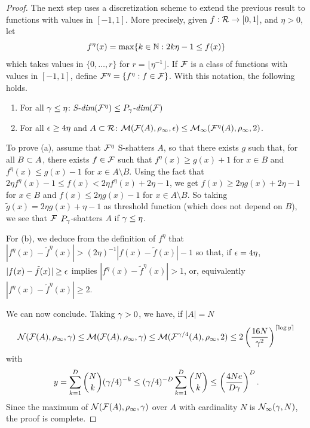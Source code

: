 \begin{proof}
 The next step uses a discretization scheme to extend the previous result to functions with values in $[-1,1]$. More precisely, given $f: \CR\to [0,1]$, and $\eta>0$, let
\[
f^\eta(x) = \max\{k\in\mN: 2k\eta -1 \leq f(x)\}
\]
which takes values in $\{0, \ldots, r\}$ for $r = \lfloor \eta^{-1}\rfloor$. If $\CF$ is a class of functions with values in $[-1,1]$, define $\CF^\eta = \{f^\eta: f\in\CF\}$. With this notation, the following holds.
\begin{enumerate}[label= (\alph*)]
\item For all $\ga \leq \eta$: $\Sdim(\CF^\eta) \leq \Pdim[\ga](\CF)$
\item For all $\ep\geq 4\eta$ and $A\sub \CR$: $\CM(\CF(A), \rho_\infty, \ep) \leq \CM_\infty(\CF^\eta(A), \rho_\infty, 2)$.
\end{enumerate}

To prove (a), assume that $\CF^\eta$ S-shatters $A$, so that there exists $g$ such that, for all $B\sub A$, there exists $f\in \CF$ such that $f^\eta(x) \geq g(x) + 1$ for $x\in B$ and $f^\eta(x) \leq g(x) - 1$ for $x \in A \setminus B$. Using the fact that $2\eta f^\eta(x) -1 \leq f(x) < 2 \eta f^\eta(x) + 2\eta - 1$, we get $f(x) \geq 2\eta g(x) +2\eta-1$ for $x\in B$ and $f(x) \leq 2\eta g(x)-1 $ for $x\in A\setminus B$. So taking $\tilde g(x) = 2\eta g(x) + \eta - 1$ as threshold function (which does not depend on $B$), we see that $\CF$ $P_\ga$-shatters $A$ if $\ga\leq \eta$.

For (b), we deduce from the definition of $f^\eta$ that $|f^\eta(x) - \tilde f^\eta(x)| > (2\eta)^{-1}|f(x) - \tilde f(x)| - 1$ so that, if $\ep = 4\eta$,  $|f(x)-\tilde f(x)| \geq \ep$    implies $|f^\eta(x) - \tilde f^\eta(x)| > 1$, or, equivalently $|f^\eta(x) - \tilde f^\eta(x)| \geq 2$.
\bigskip

 We can now conclude. Taking $\ga>0$, we have, if $|A| = N$
\[
\CN(\CF(A), \rho_\infty, \gamma) \leq \CM(\CF(A), \rho_\infty, \ga) \leq \CM(\CF^{\ga/4}(A), \rho_\infty, 2) \leq 2\left(\frac{16N}{\ga^2}\right)^{\lceil\log y\rceil}
\]
with 
\[
y = \sum_{k=1}^D \binom{N}{k} (\ga/4)^{-k} \leq (\ga/4)^{-D}\sum_{k=1}^D \binom{N}{k} \leq \left(\frac{4Ne}{D\ga}\right)^D.
\]
Since the maximum of $\CN(\CF(A), \rho_\infty, \gamma)$ over $A$ with cardinality $N$ is $\CN_\infty(\gamma, N)$, the proof is complete.
\end{proof}

